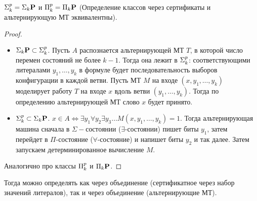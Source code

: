 \begin{theorem}
$\textbf{$\Sigma_{k}^p$} = \textbf{$\Sigma_{k}$P}$ и $\textbf{$\Pi_{k}^p$} = \textbf{$\Pi_{k}$P}$ (Определение классов через сертификаты и альтернирующую МТ эквивалентны).
\end{theorem}

\begin{proof} 
\begin{itemize}
    \item $\textbf{$\Sigma_{k}$P} \subset \textbf{$\Sigma_{k}^p$}$. Пусть $A$ распознается альтернирующей МТ $T$, в которой число перемен состояний не более $k - 1$. Тогда она лежит в $\textbf{$\Sigma_{k}^p$}$: соответствующими литералами $y_1, \ldots, y_k$ в формуле будет последовательность выборов конфигурации в каждой ветви. Пусть МТ $M$ на входе $(x, y_1, \ldots, y_k)$ моделирует работу $T$ на входе $x$ вдоль ветви $(y_1, \ldots, y_k)$. Тогда по определению альтернирующей МТ слово $x$ будет принято.
    \item $\textbf{$\Sigma_{k}^p$} \subset \textbf{$\Sigma_{k}$P}$. $x \in A \Longleftrightarrow \exists y_1 \forall y_2 \exists y_3 \ldots M(x, y_1, \ldots, y_k) = 1$. Тогда альтернирующая машина сначала в $\Sigma-состоянии$ ($\exists$-состоянии) пишет биты $y_1$, затем перейдет в $\Pi$-состояние ($\forall$-состояние) и напишет биты $y_2$ и так далее. Затем запускаем детерминированное вычисление $M$.
\end{itemize}

Аналогично про классы $\textbf{$\Pi_{k}^p$}$ и $\textbf{$\Pi_{k}$P}$.
\end{proof}

Тогда можно определять \ph как через объединение  (сертификатное через набор значений литералов), так и через объединение  (альтернирующие МТ).
